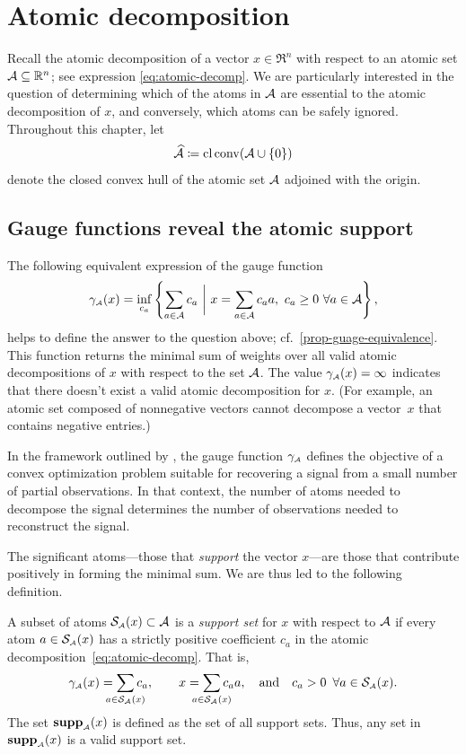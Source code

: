 \section{Atomic decomposition} \label{sec:atomic-decomposition}
Recall the atomic decomposition of a vector $x\in\Re^n$ with respect to an atomic set $\mathcal{A}\subseteq\mathbb{R}^n$; see expression \eqref{eq:atomic-decomp}. We are particularly interested in the question of determining which of the atoms
in $\mathcal{A}$ are essential to the atomic decomposition of $x$, and conversely,
which atoms can be safely ignored. Throughout this chapter, let 
\[\widehat{\mathcal{A}} \coloneqq \operatorname{cl}\operatorname{conv}(\mathcal{A} \cup \{0\})\]
denote the closed convex hull of the atomic set $\mathcal{A}$ adjoined with the origin.

\subsection{Gauge functions reveal the atomic support}
The following equivalent expression of the gauge function 
\begin{equation}
    \label{eq:gauge2}
    \gamma_{\scriptscriptstyle\mathcal{A}}(x)
    = \inf_{c_a}
      \left\{ \sum_{a\in\mathcal{A}}c_a ~\bigg\vert~ x = \sum_{a\in\mathcal{A}}c_aa,\ c_a \ge0\ \forall a\in\mathcal{A} \right\},
\end{equation}
helps to define the answer to the question above; cf.~\autoref{prop-guage-equivalence}. This function returns the
minimal sum of weights over all valid atomic decompositions of $x$ with respect
to the set $\mathcal{A}$. The value $\gamma_{\scriptscriptstyle\mathcal{A}}(x)=\infty$ indicates that there doesn't
exist a valid atomic decomposition for $x$. (For example, an atomic set composed
of nonnegative vectors cannot decompose a vector~$x$ that contains negative entries.) 

In the framework outlined by \citet{chandrasekaran2012convex}, the gauge
function $\gamma_{\scriptscriptstyle\mathcal{A}}$ defines the objective of a convex optimization problem
suitable for recovering a signal from a small number of partial observations. In
that context, the number of atoms needed to decompose the signal determines the
number of observations needed to reconstruct the signal.

The significant atoms---those that \emph{support} the
vector $x$---are those that contribute positively in forming the minimal sum. We
are thus led to the following definition.

\begin{definition} \label{def:atomic_support} A subset of atoms
    $\operatorname{\mathcal{S}_{\scriptscriptstyle\mathcal{A}}}(x)\subset\mathcal{A}$ is a \emph{support set} for $x$ with respect to
    $\mathcal{A}$ if every atom $a\in\operatorname{\mathcal{S}_{\scriptscriptstyle\mathcal{A}}}(x)$ has a strictly positive coefficient
    $c_a$ in the atomic decomposition~\eqref{eq:atomic-decomp}. That is,
    \begin{equation}
      \gauge\As(x) = \sum_{\mathclap{a\in\suppa(x)}} c_a,
      \qquad x = \sum_{\mathclap{a\in\suppa(x)}} c_aa,
      \text{and} c_a > 0\enspace \forall a\in\suppa(x).
    \end{equation}
    The set $\operatorname{\hbox{\rm\textbf{supp}}}_{\scriptscriptstyle\mathcal{A}}(x)$ is defined as the set of all support
    sets. Thus, any set in $\operatorname{\hbox{\rm\textbf{supp}}}_{\scriptscriptstyle\mathcal{A}}(x)$ is a valid support set. 
  \end{definition}

